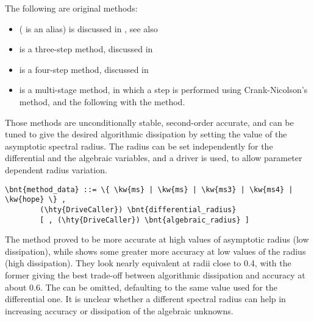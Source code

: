 The following are original methods:
\begin{itemize}
\item {} ( is an alias) is discussed in \cite{MASARATI-LANZ-MANTEGAZZA-2001},
see also
\begin{quote}
\end{quote}
\item {} is a three-step method, discussed in \cite{ZHANG-2021-COMPMECH-MS34}
\item {} is a four-step method, discussed in \cite{ZHANG-2021-COMPMECH-MS34}
\item {} is a multi-stage method, in which a step is performed using Crank-Nicolson's method, and the following with the  method.
\end{itemize}
Those methods are unconditionally stable, second-order accurate, and can be tuned to give 
the desired algorithmic dissipation
by setting the value of the asymptotic spectral radius.
The radius can be set independently for the differential
and the algebraic variables, and a driver is used, to allow parameter 
dependent radius variation.
\begin{Verbatim}[commandchars=\\\{\}]
    \bnt{method_data} ::= \{ \kw{ms} | \kw{ms} | \kw{ms3} | \kw{ms4} | \kw{hope} \} ,
        (\hty{DriveCaller}) \bnt{differential_radius}
        [ , (\hty{DriveCaller}) \bnt{algebraic_radius} ]
\end{Verbatim}
The  method proved to be more accurate at high values of asymptotic
radius (low dissipation), while  shows some greater more accuracy
at low values of the radius (high dissipation).
They look nearly equivalent at radii close to 0.4, with the former
giving the best trade-off between algorithmic dissipation and accuracy 
at about 0.6.
The  can be omitted, defaulting to the same value used for 
the differential one.
It is unclear whether a different spectral radius can help in increasing
accuracy or dissipation of the algebraic unknowns.

